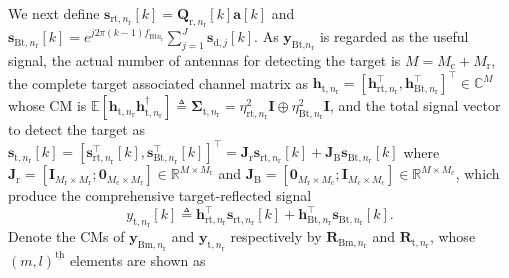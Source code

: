 \documentclass[9pt,journal]{IEEEtran}
\newcommand{\paren}[1]{\left({#1}\right)}
\newcommand{\bracket}[1]{{\left [{#1}\right ]}}
\newcommand{\ith}[1]    {{#1}^{\underline{\text{th}}}}
\newcommand{\rr}{_\mathrm{r}}
\newcommand{\cc}{_\mathrm{c}}
\newcommand{\target}{\mathrm{t}}
\newcommand{\MM}{\mathit{M}}
\newcommand{\stnrk}{\mathbf{s}_{\textrm{t},n_{\textrm{r}}}\bracket{k}}
\newcommand{\srtnrk}{\mathbf{s}_{\textrm{rt},n_{\textrm{r}}}\bracket{k}}
\newcommand{\sBtnrk}{\mathbf{s}_{\textrm{Bt},n_{\textrm{r}}}\bracket{k}}
\theoremstyle{definition}
\begin{document}
We next define $\mathbf{s}_{\mathrm{rt,}n\rr}\bracket{k}=\mathbf{Q}_{\mathrm{r,}n\rr}\bracket{k}\mathbf{a}\bracket{k}$ and $\mathbf{s}_{\mathrm{Bt},n\rr}\bracket{k}=e^{j2\pi\paren{k-1} f_{\mathrm{Bt}n_\mathrm{r}}}
\sum_{j=1}^\mathit{J}\mathbf{s}_{\textrm{d},j}\bracket{k}$. As $\mathbf{y}_{\textrm{Bt,}n\rr}$ is regarded as the useful signal, the actual number of antennas for detecting the target is $\mathit{M}=\mathit{M}\cc+\MM\rr$, the complete target associated channel matrix as $\mathbf{h}_{\target,n\rr}=\bracket{\mathbf{h}^\top_{\textrm{rt},n\rr},\mathbf{h}^\top_{\textrm{Bt},n\rr}}^\top\in\mathbb{C}^{\mathit{M}}$ whose CM is $\mathbb{E}\bracket{\mathbf{h}_{\target,n\rr}\mathbf{h}^\dagger_{\target,n\rr}}\triangleq\boldsymbol{\Sigma}_{\target,n\rr}=\eta^2_{\textrm{rt},n\rr}\mathbf{I}\oplus\eta^2_{\textrm{Bt},n\rr}\mathbf{I}$, and the total signal vector to detect the target as $\stnrk=\bracket{\mathbf{s}^\top_{\textrm{rt},n\rr}\bracket{k},\mathbf{s}^\top_{\textrm{Bt},n\rr}\bracket{k}}^\top=\mathbf{J}_{\textrm{r}}\srtnrk+\mathbf{J}_{\textrm{B}}\sBtnrk$ where $\mathbf{J}_{\textrm{r}}=\bracket{\mathbf{I}_{\mathit{M}\rr\times \mathit{M}\rr};\mathbf{0}_{\mathit{M}\cc\times \mathit{M}\rr}}\in\mathbb{R}^{\mathbf{\mathit{M}\times \mathit{M}\rr}}$ and $\mathbf{J}_{\textrm{B}}=\bracket{\mathbf{0}_{\mathit{M}\rr\times \mathit{M}\cc};\mathbf{I}_{\mathit{M}\cc\times \mathit{M}\cc}}\in\mathbb{R}^{\mathbf{\mathit{M}\times \mathit{M}\cc}}$, which produce the comprehensive target-reflected signal
\begin{equation}
y_{\target,n\rr}\bracket{k}\triangleq\mathbf{h}^\top_{\textrm{rt},n\rr}\mathbf{s}_{\textrm{rt},n\rr}\bracket{k}+\mathbf{h}^\top_{\textrm{Bt},n\rr}\mathbf{s}_{\textrm{Bt},n\rr}\bracket{k}.    
\end{equation} Denote the CMs of $\mathbf{y}_{\mathrm{Bm},n\rr}$ and $\mathbf{y}_{\mathrm{t},n\rr}$ respectively by $\mathbf{R}_{\textrm{Bm},n\rr}$ and $\mathbf{R}_{\textrm{t},n\rr}$, whose $\ith{\paren{m,l}}$ elements are shown as \par\noindent\small
\end{document}
